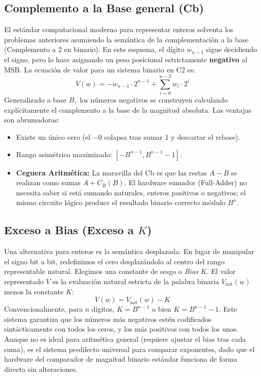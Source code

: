 \subsection{Complemento a la Base general (Cb)}
El estándar computacional moderno para representar enteros solventa los problemas anteriores asumiendo la semántica de la complementación a la base (Complemento a 2 en binario).
En este esquema, el dígito $w_{n-1}$ sigue decidiendo el signo, pero lo hace asignando un peso posicional estrictamente \textbf{negativo} al MSB. La ecuación de valor para un sistema binario en C2 es:
\[ V(w) = -w_{n-1} \cdot 2^{n-1} + \sum_{i=0}^{n-2} w_i \cdot 2^i \]
Generalizado a base $B,$ los números negativos se construyen calculando explícitamente el complemento a la base de la magnitud absoluta.
Las ventajas son abrumadoras:
\begin{itemize}
    \item Existe un único cero (el $-0$ colapsa tras sumar 1 y descartar el rebose).
    \item Rango asimétrico maximizado: $[-B^{n-1}, B^{n-1} - 1].$
    \item \textbf{Ceguera Aritmética:} La maravilla del Cb es que las restas $A - B$ se realizan como sumas $A + C_B(B).$ El hardware sumador (Full-Adder) no necesita saber si está sumando naturales, enteros positivos o negativos; el mismo circuito lógico produce el resultado binario correcto módulo $B^n.$
\end{itemize}

\subsection{Exceso a Bias (Exceso a $K$)}
Una alternativa para enteros es la semántica desplazada. En lugar de manipular el signo bit a bit, redefinimos el cero desplazándolo al centro del rango representable natural. Elegimos una constante de sesgo o \textit{Bias} $K.$
El valor representado $V$ es la evaluación natural estricta de la palabra binaria $V_{\text{nat}}(w)$ menos la constante $K:$
\[ V(w) = V_{\text{nat}}(w) - K \]
Convencionalmente, para $n$ dígitos, $K = B^{n-1}$ o bien $K = B^{n-1}-1.$ Este sistema garantiza que los números más negativos estén codificados sintácticamente con todos los ceros, y los más positivos con todos los unos. Aunque no es ideal para aritmética general (requiere ajustar el bias tras cada suma), es el sistema predilecto universal para comparar exponentes, dado que el hardware del comparador de magnitud binario estándar funciona de forma directa sin alteraciones.


